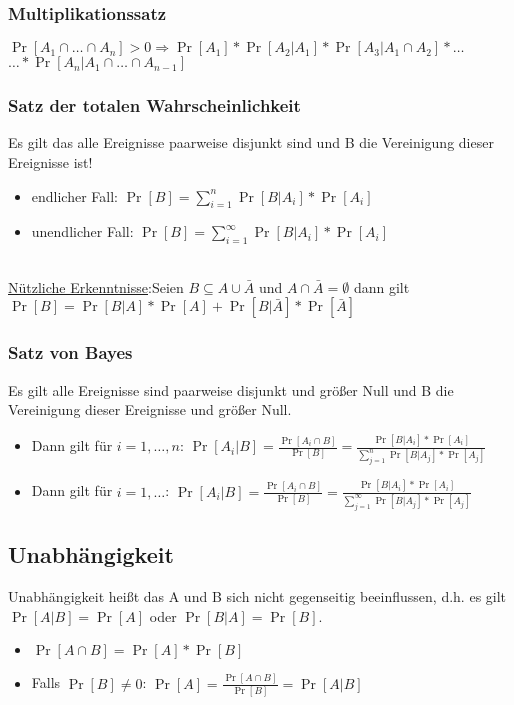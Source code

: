\subsubsection{Multiplikationssatz}
$\Pr[A_1\cap\ldots\cap A_n]>0\Rightarrow\Pr[A_1]*\Pr[A_2|A_1]*\Pr[A_3|A_1\cap A_2]*\ldots$\\
$\dots*\Pr[A_n|A_1\cap\ldots\cap A_{n-1}]$

\subsubsection{Satz der totalen Wahrscheinlichkeit}
Es gilt das alle Ereignisse paarweise disjunkt sind und B die Vereinigung dieser Ereignisse ist!
\begin{itemize}
\item endlicher Fall: $\Pr[B]=\sum_{i=1}^n\Pr[B|A_i]*\Pr[A_i]$
\item unendlicher Fall: $\Pr[B]=\sum_{i=1}^\infty\Pr[B|A_i]*\Pr[A_i]$
\end{itemize}
\\
\underline{Nützliche Erkenntnisse}:Seien $B\subseteq A\cup\bar A$ und $A\cap\bar A =\emptyset$ dann gilt $\Pr[B]=\Pr[B|A]*\Pr[A]+\Pr[B|\bar A]*\Pr[\bar A]$

\subsubsection{Satz von Bayes}
Es gilt alle Ereignisse sind paarweise disjunkt und größer Null und B die Vereinigung dieser Ereignisse und größer Null.
\begin{itemize}
\item Dann gilt für $i=1,\ldots,n$: $\Pr[A_i|B]=\frac{\Pr[A_i\cap B]}{\Pr[B]}=\frac{\Pr[B|A_i]*\Pr[A_i]}{\sum^n_{j=1}\Pr[B|A_j]*\Pr[A_j]}$
\item Dann gilt für $i=1,\ldots$: $\Pr[A_i|B]=\frac{\Pr[A_i\cap B]}{\Pr[B]}=\frac{\Pr[B|A_i]*\Pr[A_i]}{\sum^\infty_{j=1}\Pr[B|A_j]*\Pr[A_j]}$
\end{itemize}

\subsection{Unabhängigkeit}
Unabhängigkeit heißt das A und B sich nicht gegenseitig beeinflussen, d.h. es gilt $\Pr[A|B]=\Pr[A]$ oder $\Pr[B|A]=\Pr[B]$.

\begin{itemize}
\item $\Pr[A\cap B]=\Pr[A]*\Pr[B]$
\item Falls $\Pr[B]\neq0$: $\Pr[A]=\frac{\Pr[A\cap B]}{\Pr[B]}=\Pr[A|B]$
\end{itemize}

